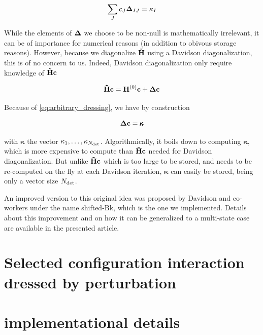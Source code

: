 \documentclass[./thesis.tex]{subfiles}
\begin{document}
\begin{equation}
\sum_J c_J {\bf \Delta}_{IJ}  = \kappa_I
\label{eq:arbitrary_dressing}
\end{equation}


While the elements of ${\bf \Delta}$ we choose to be non-null is mathematically irrelevant, it can be of importance for numerical reasons (in addition to obivous storage reasons). However, because we diagonalize ${\bf \tilde H}$ using a Davidson diagonalization, this is of no concern to us. Indeed, Davidson diagonalization only require knowledge of ${\bf \tilde H} {\bf c}$

\begin{equation}
{\bf \tilde H} {\bf c} = {\bf H}^{(0)} {\bf c} + {\bf \Delta} {\bf c}
\end{equation}

Because of \ref{eq:arbitrary_dressing}, we have by construction

\begin{equation}
{\bf \Delta} {\bf c} = {\pmb \kappa}
\end{equation}


with ${\pmb \kappa}$ the vector $\kappa_1, \ldots, \kappa_{{N_\text{det}}}$.
Algorithmically, it boils down to computing ${\pmb \kappa}$, which is more expensive to compute than ${\bf \tilde H}{\bf c}$ needed for Davidson diagonalization. But unlike ${\bf \tilde H}{\bf c}$ which is too large to be stored, and needs to be re-computed on the fly at each Davidson iteration, ${\pmb \kappa}$ can easily be stored, being only a vector size ${N_\text{det}}$.


An improved version to this original idea was proposed by Davidson and co-workers under the name shifted-Bk,\cite{Nitzsche_1978a, Nitzsche_1978b, Rawlings_1983, Kozlowski_1995, Kozlowski_1994a, Kozlowski_1994b, Kozlowski_1994c} which is the one we implemented. Details about this improvement and on how it can be generalized to a multi-state case are available in the presented article.


\section{Selected configuration interaction dressed by perturbation}






\section{implementational details}
\end{document}
